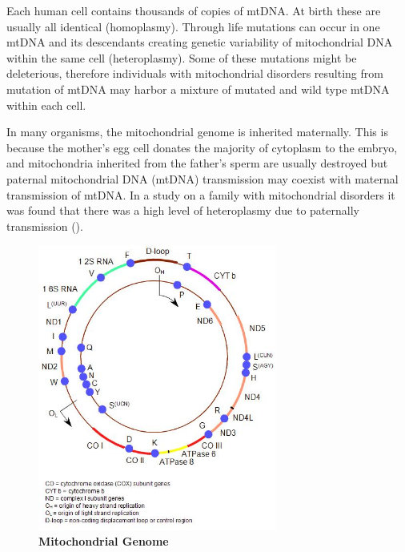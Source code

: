 Each human cell contains thousands of copies of mtDNA. At birth these are usually all identical (homoplasmy). Through life mutations can occur in one mtDNA and its descendants creating genetic variability of mitochondrial DNA within the same cell (heteroplasmy). Some of these mutations might be deleterious, therefore individuals with mitochondrial disorders resulting from mutation of mtDNA may harbor a mixture of mutated and wild type mtDNA within each cell. 

In many organisms, the mitochondrial genome is inherited maternally. This is because the mother’s egg cell donates the majority of cytoplasm to the embryo, and mitochondria inherited from the father’s sperm are usually destroyed but paternal mitochondrial DNA (mtDNA) transmission may coexist with maternal transmission of mtDNA. In a study on a family with mitochondrial disorders it was found that there was a high level of heteroplasmy due to paternally transmission (\cite{luo2018biparental}). 

\begin{figure}[H]
\centering
\includegraphics[width=0.7\textwidth]{Fig/mitogenome.jpg}
\decoRule
\caption{\textbf{Mitochondrial Genome}}
\label{fig:Mitochondrial Genome}
\end{figure}


